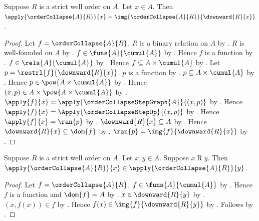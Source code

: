 \begin{proposition}\label{order_collapse_equation}
    Suppose $R$ is a strict well order on $A$.
    Let $x\in A$.
    Then
        $\apply{\orderCollapse{A}{R}}{x}
            =\img{\orderCollapse{A}{R}}{\downward{R}{x}}$.
\end{proposition}
\begin{proof}
    Let $f=\orderCollapse{A}{R}$.
    $R$ is a binary relation on $A$
        by
        .
    $R$ is well-founded on $A$
        by .
    $f\in\funs{A}{\cumul{A}}$ by .
    Hence $f$ is a function by .
    $f\in\rels{A}{\cumul{A}}$
        by .
    Hence $f\subseteq A\times\cumul{A}$ by .
    Let $p=\restrl{f}{\downward{R}{x}}$.
    $p$ is a function by .
    $p\subseteq A\times\cumul{A}$
        by .
    Hence $p\in\pow{A\times\cumul{A}}$
        by .
    Hence $(x,p)\in A\times\pow{A\times\cumul{A}}$
        by .
    $\apply{f}{x}
        =\apply{\orderCollapseStepGraph{A}}{(x,p)}$
        by
        .
    Hence $\apply{f}{x}=\Apply{\orderCollapseStepOp}{(x,p)}$
        by .
    Hence $\apply{f}{x}=\ran{p}$
        by
        .
    $\downward{R}{x}\subseteq A$
        by
        .
    Hence $\downward{R}{x}\subseteq\dom{f}$ by .
    $\ran{p}=\img{f}{\downward{R}{x}}$
        by .
\end{proof}

\begin{proposition}\label{order_collapse_preserves_forward}
    Suppose $R$ is a strict well order on $A$.
    Let $x,y\in A$.
    Suppose $x\mathrel{R}y$.
    Then
        $\apply{\orderCollapse{A}{R}}{x}
            \in\apply{\orderCollapse{A}{R}}{y}$.
\end{proposition}
\begin{proof}
    Let $f=\orderCollapse{A}{R}$.
    $f\in\funs{A}{\cumul{A}}$ by .
    Hence $f$ is a function and $\dom{f}=A$
        by .
    $x\in\downward{R}{y}$ by .
    $(x,f(x))\in f$ by .
    Hence $f(x)\in\img{f}{\downward{R}{y}}$
        by .
    Follows by .
\end{proof}

